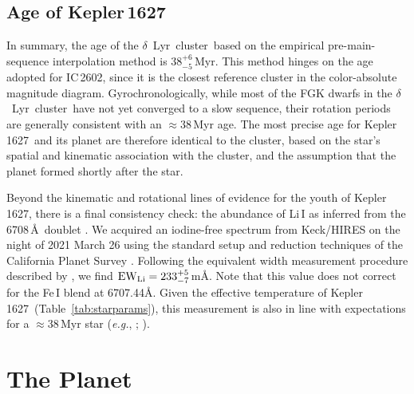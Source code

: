 \documentclass[12pt,modern,twocolumn,tighten]{aastex63}
\newcommand{\cn}{$\delta$\ Lyr\ cluster} %
\newcommand{\sn}{Kepler\,1627} %
\newcommand{\clusterage}{$38^{+6}_{-5}$\,Myr} %
\begin{document}
\subsection{Age of Kepler\,1627}

In summary, the age of the \cn\ based on the empirical
pre-main-sequence interpolation method is \clusterage.  This method
hinges on the age adopted for IC\,2602, since it is the closest
reference cluster in the color-absolute magnitude diagram.
Gyrochronologically, while most of the FGK dwarfs in the \cn\ have
not yet converged to a slow sequence, their rotation periods 
are generally consistent with an $\approx$38\,Myr age. The most
precise age for \sn\ and its planet are therefore identical to the cluster,
based on the star's spatial and kinematic association with the
cluster, and the assumption that the planet formed shortly after
the star.

Beyond the kinematic and rotational lines of evidence for the youth of
\sn, there is a final consistency check: the abundance of
Li\,\textsc{I} as inferred from the 6708\,\AA\ doublet \citep[see {\it
e.g.},][]{soderblom_ages_2014}.  We acquired an iodine-free spectrum
from Keck/HIRES on the night of 2021 March 26 using the standard setup
and reduction techniques of the California Planet Survey
\citep{howard_cps_2010}.  Following the equivalent width measurement
procedure described by \citet{bouma_2021_ngc2516}, we find ${\rm
EW}_{\rm Li} = 233^{+5}_{-7}$\,m\AA.   Note that this value does not
correct for the Fe\,\textsc{I} blend at 6707.44\AA.  Given the
effective temperature of \sn\ (Table~\ref{tab:starparams}), this
measurement is also in line with expectations for a $\approx$38\,Myr
star ({\it e.g.}, \citealt{randich_gaiaeso_2018};
\citealt{bouma_2021_ngc2516}).


\section{The Planet}
\label{sec:planet}
\end{document}
